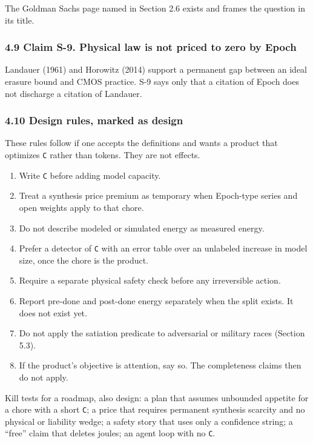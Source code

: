 \documentclass[
  10pt,
]{article}
\providecommand{\tightlist}{%
  \setlength{\itemsep}{0pt}\setlength{\parskip}{0pt}}
\begin{document}
The Goldman Sachs page named in Section 2.6 exists and frames the
question in its title.

\subsubsection{4.9 Claim S-9. Physical law is not priced to zero by
Epoch}\label{claim-s-9.-physical-law-is-not-priced-to-zero-by-epoch}

Landauer (1961) and Horowitz (2014) support a permanent gap between an
ideal erasure bound and CMOS practice. S-9 says only that a citation of
Epoch does not discharge a citation of Landauer.

\subsubsection{4.10 Design rules, marked as
design}\label{design-rules-marked-as-design}

These rules follow if one accepts the definitions and wants a product
that optimizes \texttt{C} rather than tokens. They are not effects.

\begin{enumerate}
\def\labelenumi{\arabic{enumi}.}
\tightlist
\item
  Write \texttt{C} before adding model capacity.
\item
  Treat a synthesis price premium as temporary when Epoch-type series
  and open weights apply to that chore.
\item
  Do not describe modeled or simulated energy as measured energy.
\item
  Prefer a detector of \texttt{C} with an error table over an unlabeled
  increase in model size, once the chore is the product.
\item
  Require a separate physical safety check before any irreversible
  action.
\item
  Report pre-done and post-done energy separately when the split exists.
  It does not exist yet.
\item
  Do not apply the satiation predicate to adversarial or military races
  (Section 5.3).
\item
  If the product's objective is attention, say so. The completeness
  claims then do not apply.
\end{enumerate}

Kill tests for a roadmap, also design: a plan that assumes unbounded
appetite for a chore with a short \texttt{C}; a price that requires
permanent synthesis scarcity and no physical or liability wedge; a
safety story that uses only a confidence string; a ``free'' claim that
deletes joules; an agent loop with no \texttt{C}.
\end{document}
